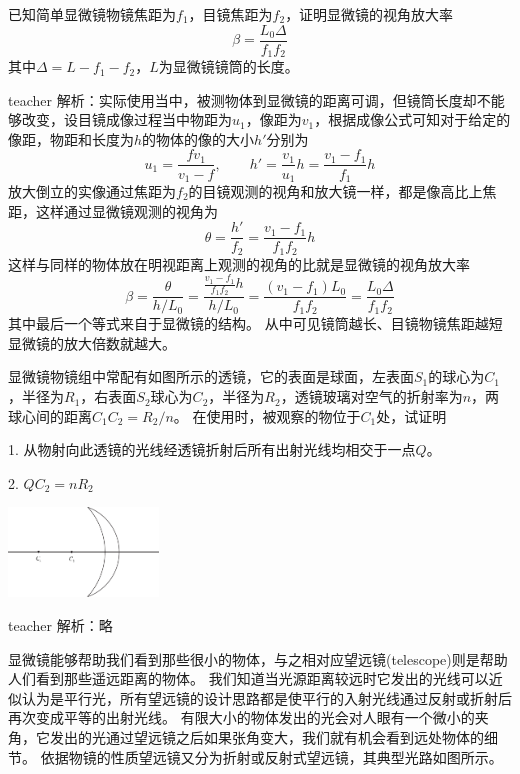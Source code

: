 \begin{example}
已知简单显微镜物镜焦距为$f_1$，目镜焦距为$f_2$，证明显微镜的视角放大率
\[\beta = \frac{ L_0\Delta}{f_1f_2}\]
其中$\Delta = L-f_1-f_2$，$L$为显微镜镜筒的长度。
\begin{taggedblock}{teacher}
\newline
解析：实际使用当中，被测物体到显微镜的距离可调，但镜筒长度却不能够改变，设目镜成像过程当中物距为$u_1$，像距为$v_1$，根据成像公式可知对于给定的像距，物距和长度为$h$的物体的像的大小$h'$分别为
\[u_1=\frac{fv_1}{v_1-f} , \qquad h'=\frac{v_1}{u_1}h = \frac{v_1-f_1}{f_1}h \]
放大倒立的实像通过焦距为$f_2$的目镜观测的视角和放大镜一样，都是像高比上焦距，这样通过显微镜观测的视角为
\[
\theta = \frac{h'}{f_2} = \frac{v_1-f_1}{f_1f_2}h
\]
这样与同样的物体放在明视距离上观测的视角的比就是显微镜的视角放大率
\[
\beta = \frac{\theta}{h/L_0}=\frac{\frac{v_1-f_1}{f_1f_2}h}{h/L_0}=\frac{(v_1-f_1)L_0}{f_1f_2}= \frac{ L_0\Delta}{f_1f_2}
\]
其中最后一个等式来自于显微镜的结构。
从中可见镜筒越长、目镜物镜焦距越短显微镜的放大倍数就越大。
\end{taggedblock}
\end{example}


\begin{example}
	显微镜物镜组中常配有如图所示的透镜，它的表面是球面，左表面$S_1$的球心为$C_1$，半径为$R_1$，右表面$S_2$球心为$C_2$，半径为$R_2$，透镜玻璃对空气的折射率为$n$，两球心间的距离$C_1C_2=R_2/n$。
	在使用时，被观察的物位于$C_1$处，试证明
	
	1. 从物射向此透镜的光线经透镜折射后所有出射光线均相交于一点$Q$。
	
	2. $QC_2 = nR_2$
	
		\begin{flushright}
			\includegraphics[width = 0.3\textwidth]{images/opt-12.pdf} 
		\end{flushright}
	\begin{taggedblock}{teacher}
		\noindent
		解析：略
	\end{taggedblock}
\end{example}


显微镜能够帮助我们看到那些很小的物体，与之相对应{\heiti 望远镜}(telescope)则是帮助人们看到那些遥远距离的物体。
我们知道当光源距离较远时它发出的光线可以近似认为是平行光，所有望远镜的设计思路都是使平行的入射光线通过反射或折射后再次变成平等的出射光线。
有限大小的物体发出的光会对人眼有一个微小的夹角，它发出的光通过望远镜之后如果张角变大，我们就有机会看到远处物体的细节。
依据物镜的性质望远镜又分为折射或反射式望远镜，其典型光路如图所示。

